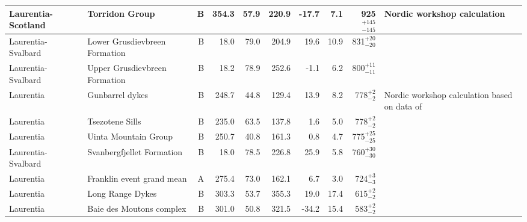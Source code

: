 \begin{longtable}{p{1 in}p{1 in}rrrrrrrp{1.5 in}}
            Laurentia-Scotland &                                   Torridon Group &      B &     354.3 &      57.9 & 220.9 & -17.7 &       7.1 &  925$^{+145}_{-145}$ &                        Nordic workshop calculation \\ \hline
            Laurentia-Svalbard &                    Lower Grusdievbreen Formation &      B &      18.0 &      79.0 & 204.9 &  19.6 &      10.9 &    831$^{+20}_{-20}$ &                                 \cite{Maloof2006a} \\ \hline
            Laurentia-Svalbard &                    Upper Grusdievbreen Formation &      B &      18.2 &      78.9 & 252.6 &  -1.1 &       6.2 &    800$^{+11}_{-11}$ &                                 \cite{Maloof2006a} \\ \hline
                     Laurentia &                                  Gunbarrel dykes &      B &     248.7 &      44.8 & 129.4 &  13.9 &       8.2 &      778$^{+2}_{-2}$ &  Nordic workshop calculation based on data of \cite{Harlan1993a, Harlan1997a} \\ \hline
                     Laurentia &                                  Tsezotene Sills &      B &     235.0 &      63.5 & 137.8 &   1.6 &       5.0 &      778$^{+2}_{-2}$ &                                   \cite{Park1989a} \\ \hline
                     Laurentia &                             Uinta Mountain Group &      B &     250.7 &      40.8 & 161.3 &   0.8 &       4.7 &    775$^{+25}_{-25}$ &                                   \cite{Weil2006a} \\ \hline
            Laurentia-Svalbard &                        Svanbergfjellet Formation &      B &      18.0 &      78.5 & 226.8 &  25.9 &       5.8 &    760$^{+30}_{-30}$ &                                 \cite{Maloof2006a} \\ \hline
                     Laurentia &                        Franklin event grand mean &      A &     275.4 &      73.0 & 162.1 &   6.7 &       3.0 &      724$^{+3}_{-3}$ &                               \cite{Denyszyn2009a} \\ \hline
                     Laurentia &                                 Long Range Dykes &      B &     303.3 &      53.7 & 355.3 &  19.0 &      17.4 &      615$^{+2}_{-2}$ &                                 \cite{Murthy1992a} \\ \hline
                     Laurentia &                         Baie des Moutons complex &      B &     301.0 &      50.8 & 321.5 & -34.2 &      15.4 &      583$^{+2}_{-2}$ &                             \cite{McCausland2011a} \\ \hline

\end{longtable}

